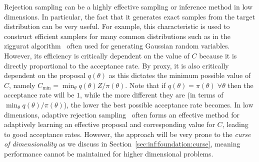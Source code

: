 Rejection sampling can be a highly effective sampling or inference method in low dimensions.
In particular, the fact that it generates exact samples from the target distribution can be very
useful.  For example, this characteristic is used to construct efficient samplers for many 
common distributions such as in the ziggurat algorithm~\citep{marsaglia2000ziggurat} often
used for generating Gaussian random variables.  However, its efficiency is critically dependent
on the value of $C$ because it is directly proportional to the acceptance rate.  By proxy, it
is also critically dependent on the proposal $q(\theta)$ as this dictates the minimum possible
value of $C$, namely $C_{\min} = \min_{\theta} q(\theta) Z / \pi(\theta)$.  Note that if 
$q(\theta) = \pi(\theta) \; \forall \theta$ then the acceptance rate will be $1$, while the
more different they are (in terms of $\min_{\theta} q(\theta) / \pi(\theta)$), the lower the
best possible acceptance rate becomes.  In low dimensions, adaptive rejection 
sampling~\citep{gilks1992adaptive} often forms an effective method for adaptively 
learning an effective proposal and corresponding value for $C$, leading to good acceptance
rates.  However, the approach will be very prone to the \emph{curse of dimensionality} as
we discuss in Section~\ref{sec:inf:foundation:curse}, meaning performance cannot be
maintained for higher dimensional problems.